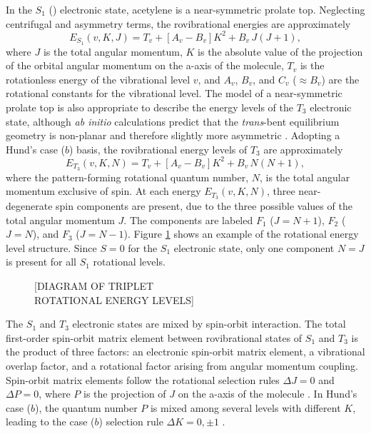 \documentclass[12pt]{mitthesis}
\begin{document}
In the $S_1$ (\astate) electronic state, acetylene is a near-symmetric
prolate top.  Neglecting centrifugal and asymmetry terms, the
rovibrational energies are approximately \cite{watson82}
\begin{equation}
  \label{eq:s1-energy-levels}
  E_{S_1}(v,K,J) = T_v + [A_v - B_v] K^2 + B_v \, J(J+1),
\end{equation}
where $J$ is the total angular momentum, $K$ is the absolute value of
the projection of the orbital angular momentum on the a-axis of the
molecule, $T_v$ is the rotationless energy of the vibrational level
$v$, and $A_v$, $B_v$, and $C_v$ ($\approx B_v$) are the rotational
constants for the vibrational level.  The model of a near-symmetric
prolate top is also appropriate to describe the energy levels of the
$T_3$ electronic state, although \emph{ab initio} calculations predict
that the \emph{trans}-bent equilibrium geometry is non-planar and
therefore slightly more asymmetric \cite{ventura03, thom07}.  Adopting
a Hund's case ($b$) basis, the rovibrational energy levels of $T_3$
are approximately
\begin{equation}
  \label{eq:t3-energy-levels}
  E_{T_3}(v,K,N) = T_v + [A_v - B_v] K^2 + B_v \, N(N+1),
\end{equation}
where the pattern-forming rotational quantum number, $N$, is the total
angular momentum exclusive of spin.  At each energy $E_{T_3}(v,K,N)$,
three near-degenerate spin components are present, due to the three
possible values of the total angular momentum $J$.  The components are
labeled $F_1$ ($J=N+1$), $F_2$ ($J=N$), and $F_3$ ($J=N-1$).  Figure
\ref{fig:triplet-rot-structure} shows an example of the rotational
energy level structure.  Since $S=0$ for the $S_1$ electronic state,
only one component $N=J$ is present for all $S_1$ rotational levels.

\begin{figure}
  \caption{}
  \label{fig:triplet-rot-structure}
  \centering

  \vspace{4in}
  [DIAGRAM OF TRIPLET\\ 
   ROTATIONAL ENERGY LEVELS]
  \vspace{4in}
\end{figure}

The $S_1$ and $T_3$ electronic states are mixed by spin-orbit
interaction.  The total first-order spin-orbit matrix element between
rovibrational states of $S_1$ and $T_3$ is the product of three
factors: an electronic spin-orbit matrix element, a vibrational
overlap factor, and a rotational factor arising from angular momentum
coupling.  Spin-orbit matrix elements follow the rotational selection
rules $\Delta J = 0$ and $\Delta P = 0$, where $P$ is the projection
of $J$ on the a-axis of the molecule \cite{hougen64}.  In Hund's case
($b$), the quantum number $P$ is mixed among several levels with
different $K$, leading to the case ($b$) selection rule $\Delta K = 0,
\pm 1$ \cite{hougen64, stevens73}.
\end{document}
